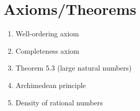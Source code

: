 \documentclass[12pt]{amsart}
\begin{document}
\section*{Axioms/Theorems}

\begin{enumerate}
	\item Well-ordering axiom
	\item Completeness axiom

	\item Theorem 5.3 (large natural numbers)
	\item Archimedean principle
	\item Density of rational numbers
		\begin{comment}
		/ irrational numbers
	\item Triangle inequality
	\item Theorem 12.2 (limits and algebra)
	\item Squeeze Theorem
	\item Monotone convergence theorem
	\item Principle of induction
	\item Theorem 18.6 (convergence and subsequences)
	\item Theorem 19.2 (sequence with subsequences converging to every real number)
	\item Cantor's Theorem

	\item Bolzano-Weierstrass

	\item Main corollary of Bolzano-Weierstrass
	\item Cauchy if and only if convergent

	\item Theorem~25.1 (limits and sequences)
	\item Theorem~26.4 (limits of functions and algebra)
	\item Squeeze Theorem for functions

	\item Theorem~27.5 (continuity and limits)
	
	\item Theorem~28.1 (continuity and algebra)
	\item Theorem~28.3 (continuity and compositions)
		\item Intermediate Value Theorem
	\item Boundedness Theorem
	\item Extreme Value Theorem
	

	\item Derivatives and algebra (Theorem 32.9)
	\item Chain rule (Theorem 33.3)
		\item Min-Max Theorem
	\item Mean Value Theorem
	\item Increasing/decreasing functions and derivatives
\end{comment}
\end{enumerate}
\end{document}
